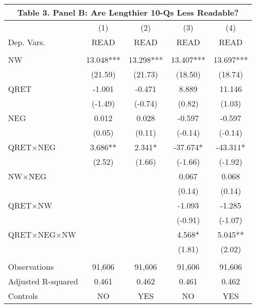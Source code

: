 \begin{table}[H] \label{T3PB}
	\centering
	\begin{tabular}{lcccc}
		\multicolumn{5}{c}{\textbf{Table 3. Panel B: Are Lengthier 10-Qs Less Readable?}} \\
		\midrule
		\midrule
		& (1) & (2) & (3) & (4) \\
		Dep. Vars. & READ & READ & READ & READ \\
		\midrule
		&   &   &   &  \\
		NW & 13.048*** & 13.298*** & 13.407*** & 13.697*** \\
		& (21.59) & (21.73) & (18.50) & (18.74) \\
		QRET & -1.001 & -0.471 & 8.889 & 11.146 \\
		& (-1.49) & (-0.74) & (0.82) & (1.03) \\
		NEG & 0.012 & 0.028 & -0.597 & -0.597 \\
		& (0.05) & (0.11) & (-0.14) & (-0.14) \\
		QRET$\times$NEG & 3.686** & 2.341* & -37.674* & -43.311* \\
		& (2.52) & (1.66) & (-1.66) & (-1.92) \\
		NW$\times$NEG &   &   & 0.067 & 0.068 \\
		&   &   & (0.14) & (0.14) \\
		QRET$\times$NW &   &   & -1.093 & -1.285 \\
		&   &   & (-0.91) & (-1.07) \\
		QRET$\times$NEG$\times$NW &   &   & 4.568* & 5.045** \\
		&   &   & (1.81) & (2.02) \\
		&   &   &   &  \\
		Observations & 91,606 & 91,606 & 91,606 & 91,606 \\
		Adjusted R-squared & 0.461 & 0.462 & 0.461 & 0.462 \\
		Controls & NO & YES & NO & YES \\
		\bottomrule
		\bottomrule
	\end{tabular}%
\end{table}%
